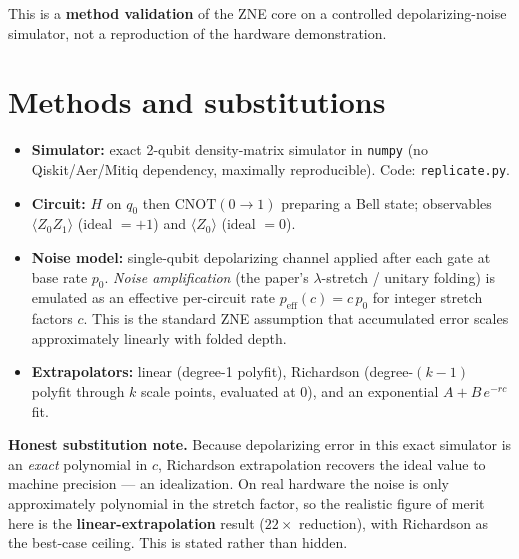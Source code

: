 \documentclass[11pt]{article}
\begin{document}
This is a \textbf{method validation} of the ZNE core on a controlled
depolarizing-noise simulator, not a reproduction of the hardware
demonstration.

\section{Methods and substitutions}
\begin{itemize}
  \item \textbf{Simulator:} exact 2-qubit density-matrix simulator in
        \texttt{numpy} (no Qiskit/Aer/Mitiq dependency, maximally
        reproducible). Code: \texttt{replicate.py}.
  \item \textbf{Circuit:} $H$ on $q_0$ then $\mathrm{CNOT}(0\!\to\!1)$
        preparing a Bell state; observables $\langle Z_0 Z_1\rangle$
        (ideal $=+1$) and $\langle Z_0\rangle$ (ideal $=0$).
  \item \textbf{Noise model:} single-qubit depolarizing channel applied
        after each gate at base rate $p_0$. \emph{Noise amplification}
        (the paper's $\lambda$-stretch / unitary folding) is emulated as an
        effective per-circuit rate $p_{\mathrm{eff}}(c) = c\,p_0$ for
        integer stretch factors $c$. This is the standard ZNE assumption
        that accumulated error scales approximately linearly with folded
        depth.
  \item \textbf{Extrapolators:} linear (degree-1 polyfit), Richardson
        (degree-$(k{-}1)$ polyfit through $k$ scale points, evaluated at 0),
        and an exponential $A + B\,e^{-r c}$ fit.
\end{itemize}
\textbf{Honest substitution note.} Because depolarizing error in this exact
simulator is an \emph{exact} polynomial in $c$, Richardson extrapolation
recovers the ideal value to machine precision --- an idealization. On real
hardware the noise is only approximately polynomial in the stretch factor,
so the realistic figure of merit here is the \textbf{linear-extrapolation}
result ($22\times$ reduction), with Richardson as the best-case ceiling.
This is stated rather than hidden.
\end{document}
